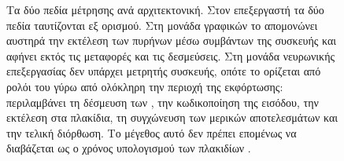 \begin{figure}[H]
\begin{tikzpicture}[x=1.0cm, y=1.0cm]
    \end{tikzpicture}
    \caption[Τα δύο πεδία μέτρησης ανά αρχιτεκτονική]{Τα δύο πεδία μέτρησης ανά αρχιτεκτονική. Στον επεξεργαστή τα δύο πεδία
    ταυτίζονται εξ ορισμού. Στη μονάδα γραφικών το  απομονώνει αυστηρά την
    εκτέλεση των πυρήνων μέσω συμβάντων της συσκευής και αφήνει εκτός τις μεταφορές
    και τις δεσμεύσεις. Στη μονάδα νευρωνικής επεξεργασίας δεν υπάρχει μετρητής
    συσκευής, οπότε το  ορίζεται από ρολόι του  γύρω από ολόκληρη
    την περιοχή της εκφόρτωσης: περιλαμβάνει τη δέσμευση των , την
    κωδικοποίηση της εισόδου, την εκτέλεση στα πλακίδια, τη συγχώνευση των μερικών
    αποτελεσμάτων και την τελική διόρθωση. Το μέγεθος αυτό δεν πρέπει επομένως να
    διαβάζεται ως ο χρόνος υπολογισμού των πλακιδίων .}
    \label{fig:meth-scopes}
\end{figure}
